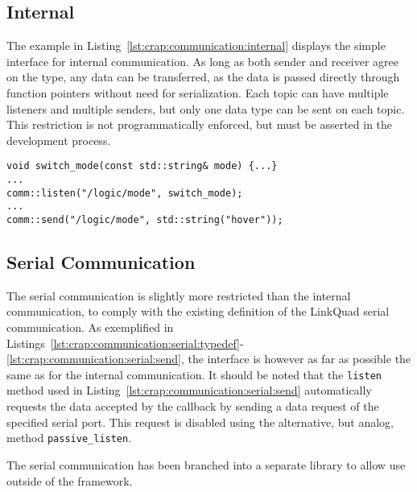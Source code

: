         \subsection{Internal}
        The example in Listing~\ref{lst:crap:communication:internal}
        displays the simple interface for internal communication.
        As long as both sender and receiver agree on the type, any data
        can be transferred, as the data is passed directly through function
        pointers without need for serialization. Each topic can have multiple listeners
        and multiple senders, but only one data type can be sent on each topic.
        This restriction is not programmatically enforced, but must be asserted
        in the development process.

        \begin{minipage}{\textwidth}
        \begin{lstlisting}
void switch_mode(const std::string& mode) {...}
...
comm::listen("/logic/mode", switch_mode);
...
comm::send("/logic/mode", std::string("hover"));
        \end{lstlisting}
        \end{minipage}

        \subsection{Serial Communication}
            The serial communication is slightly more restricted than the
            internal communication, to comply with the existing definition
            of the LinkQuad serial communication.
            As exemplified in Listings~\ref{lst:crap:communication:serial:typedef}-\ref{lst:crap:communication:serial:send},
            the interface is however as far as possible the same as for the internal
            communication. It should be noted that the \texttt{listen} method
            used in Listing~\ref{lst:crap:communication:serial:send}
            automatically requests the data accepted by the callback by sending
            a data request of the specified serial port. This request is
            disabled using the alternative, but analog, method \texttt{passive\_listen}.

            The serial communication has been branched into a separate
            library to allow use outside of the \crap framework.

